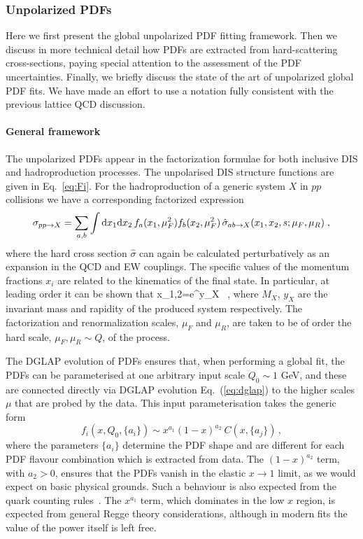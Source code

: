 \subsubsection{Unpolarized PDFs}
\label{sec:unpPDFs}

Here we first present the global unpolarized PDF fitting framework.
%
Then we discuss in more technical detail how PDFs are extracted
from hard-scattering cross-sections, paying special attention
to the assessment of the PDF uncertainties.
%
Finally, we briefly discuss the state of the art of unpolarized
global PDF fits.
%
We have made an effort to use a notation fully consistent
with the previous lattice QCD discussion.

\paragraph{General framework}
%
The unpolarized PDFs appear in the factorization formulae for both inclusive DIS and hadroproduction processes. The unpolarised DIS structure functions are given in Eq.~\eqref{eq:Fi}.
For the hadroproduction of a generic system $X$ in $pp$ collisions we have
a corresponding factorized expression
\begin{equation}
  \label{eq:LHCxsec}
\sigma_{pp\to X}=\sum_{a,b}\int {\rm d}x_1 {\rm d}x_2\, f_a(x_1,\mu_F^2)f_b(x_2,\mu_F^2)\,\hat{\sigma}_{ab\to X}(x_1,x_2,s;\mu_{F},\mu_R)\;,
\end{equation}
where the hard cross section $\hat{\sigma}$ can again be calculated perturbatively as an expansion in the QCD and EW couplings.
%
The specific values of the momentum fractions
$x_i$ are related to the kinematics of the final state.
%
In particular, at leading order it can be shown that
\be
x_{1,2}=e^{\pm y_X} \, ,
\ee
where $M_X$, $y_X$ are the invariant mass and rapidity of the produced system respectively.
%
The factorization and renormalization scales, $\mu_F$ and $\mu_R$, are taken to be of order the hard scale, $\mu_F,\mu_R
\sim Q$, of the process.

The DGLAP evolution of PDFs ensures that, when performing a global fit, the PDFs can be parameterised at one arbitrary input scale $Q_0\sim 1$ GeV, and these are connected directly via
DGLAP evolution
Eq.~(\ref{eq:dglap}) to the higher scales $\mu$ that are probed by the data.
This input parameterisation takes the generic form
\begin{equation}
\label{eq:pdffunc}
f_{i}(x,Q_0,\{a_i\})\sim x^{a_1}(1-x)^{a_2}\:C(x,\{a_j\})\, ,
\end{equation}
where the parameters $\{a_i\}$ determine the PDF shape
and are different for each PDF flavour combination which
is extracted from data.
%
The $(1-x)^{a_2}$ term, with $a_{2}>0$, ensures that the PDFs
vanish in the elastic $x\to 1$ limit, as we would expect on basic physical grounds. 
%
Such a behaviour is also expected from the quark
counting rules~\cite{Brodsky:1973kr,Ball:2016spl}.
%
The $x^{a_1}$ term, which dominates in the low $x$
region, is expected from general Regge theory considerations, although in modern fits the value of the power itself is left free.


